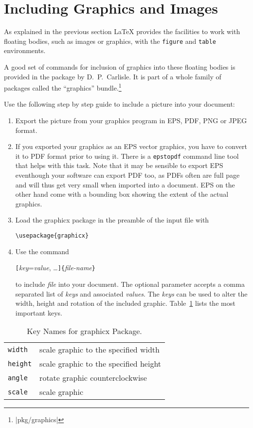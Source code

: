 \section{Including Graphics and Images}\label{eps}

As explained in the previous section \LaTeX{} provides the facilities to work with floating bodies,
such as images or graphics, with the \texttt{figure} and
\texttt{table} environments.

A good set of commands for inclusion of graphics into these floating bodies is provided in the
 package by D.~P.~Carlisle. It is part of a whole family
of packages called the ``graphics''
bundle.\footnote{\CTAN|pkg/graphics|}

Use the following step by step guide to
include a picture into your document:

\begin{enumerate}
\item Export the picture from your graphics program in EPS, PDF, PNG or JPEG format.
\item If you exported your graphics as an EPS vector graphics, you have to convert it to PDF format
prior to using it. There is a \texttt{epstopdf} command line tool that helps with this task.
Note that it may be sensible to export EPS eventhough your software can export PDF too, as PDFs often are full page and will
thus get very small when imported into a document. EPS on the other hand come with a bounding box showing the extent of the actual graphics.
\item Load the \textsf{graphicx} package in the preamble of the input
  file with
\begin{lscommand}
\verb|\usepackage{graphicx}|
\end{lscommand}
\item Use the command
\begin{lscommand}
\verb|[|\emph{key}=\emph{value}, \ldots\verb|]{|\emph{file-name}\verb|}|
\end{lscommand}
\noindent to include \emph{file} into your document. The optional parameter
accepts a comma separated list of \emph{keys} and associated
\emph{values}. The \emph{keys} can be used to alter the width, height
and rotation of the included graphic. Table~\ref{keyvals} lists the
most important keys.
\end{enumerate}

\begin{table}[tb]
\caption{Key Names for \textsf{graphicx} Package.}
\label{keyvals}
\begin{lined}{9cm}
\begin{tabular}{@{}ll}
\texttt{width}& scale graphic to the specified width\\
\texttt{height}& scale graphic to the specified height\\
\texttt{angle}& rotate graphic counterclockwise\\
\texttt{scale}& scale graphic \\
\end{tabular}

\bigskip
\end{lined}
\end{table}

